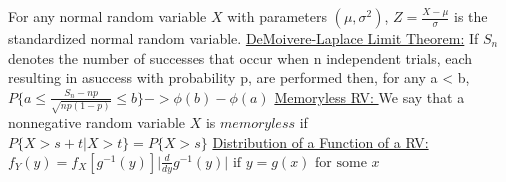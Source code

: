 \documentclass{article}
\begin{document}
	\newline
	For any normal random variable $X$ with parameters $(\mu, \sigma^2)$, $Z = \frac{X - \mu}{\sigma}$ is the standardized normal random variable.
	\newline
	\underline{DeMoivere-Laplace Limit Theorem:} If $S_n$ denotes the number of successes that occur when n independent trials, each resulting in asuccess with probability p, are performed then, for any a < b, $P\{a \leq \frac{S_n -np}{\sqrt{np(1 -p)}} \leq b\} -> \phi(b) - \phi(a)$
	\newline
	\underline{Memoryless RV: } We say that a nonnegative random variable $X$ is $memoryless$ if $P\{X >s + t \vert X > t\} = P\{X > s\}$
	\newline
	\underline{Distribution of a Function of a RV: } $f_Y(y) = f_X[g^{-1}(y)] \vert{\frac{d}{dy}g^{-1}(y)}\vert \text{  if } y = g(x) \text{ for some } x$
\end{document}
